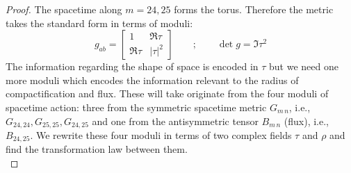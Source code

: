 \begin{tcolorbox}[breakable]
	\begin{proof}
		The spacetime along $m=24,25$ forms the torus. Therefore the metric takes the standard form in terms of moduli:
		\begin{equation}
			g_{ab}=\begin{bmatrix}
				1 & \Re{\tau}\\
				\Re{\tau} & |\tau|^2
			\end{bmatrix}\qquad;\qquad\operatorname{det} g= \Im{\tau}^2
		\end{equation}
		The information regarding the shape of space is encoded in $\tau$ but we need one more moduli which encodes the information relevant to the radius of compactification and flux.
		These will take originate from the four moduli of spacetime action: three from the symmetric spacetime metric $G_{m\,n}$, i.e., $G_{24,24}, G_{25,25}, G_{24,25}$ and one from the antisymmetric tensor $B_{m\,n}$ (flux), i.e., $B_{24,25}$. We rewrite these four moduli in terms of two complex fields $\tau$ and $\rho$ and find the transformation law between them. \\
		

\end{proof}
\end{tcolorbox}
